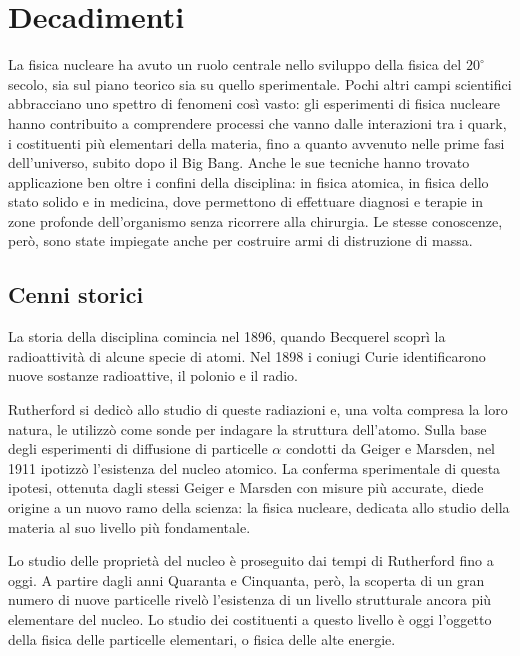 \restoregeometry


\chapter{Decadimenti}

La fisica nucleare ha avuto un ruolo centrale nello sviluppo della fisica del $20^\circ$ secolo, sia sul piano teorico sia su quello sperimentale. 
Pochi altri campi scientifici abbracciano uno spettro di fenomeni così vasto: gli esperimenti di fisica nucleare hanno contribuito a comprendere processi che vanno dalle interazioni tra i quark, i costituenti più elementari della materia, fino a quanto avvenuto nelle prime fasi dell'universo, subito dopo il Big Bang. 
Anche le sue tecniche hanno trovato applicazione ben oltre i confini della disciplina: in fisica atomica, in fisica dello stato solido e in medicina, dove permettono di effettuare diagnosi e terapie in zone profonde dell'organismo senza ricorrere alla chirurgia. Le stesse conoscenze, però, sono state impiegate anche per costruire armi di distruzione di massa.\\

\section*{Cenni storici}

La storia della disciplina comincia nel 1896, quando Becquerel scoprì la radioattività di alcune specie di atomi. Nel 1898 i coniugi Curie identificarono nuove sostanze radioattive, il polonio e il radio. 

Rutherford si dedicò allo studio di queste radiazioni e, una volta compresa la loro natura, le utilizzò come sonde per indagare la struttura dell'atomo. Sulla base degli esperimenti di diffusione di particelle $\alpha$ condotti da Geiger e Marsden, nel 1911 ipotizzò l'esistenza del nucleo atomico. La conferma sperimentale di questa ipotesi, ottenuta dagli stessi Geiger e Marsden con misure più accurate, diede origine a un nuovo ramo della scienza: la fisica nucleare, dedicata allo studio della materia al suo livello più fondamentale. 

Lo studio delle proprietà del nucleo è proseguito dai tempi di Rutherford fino a oggi. A partire dagli anni Quaranta e Cinquanta, però, la scoperta di un gran numero di nuove particelle rivelò l'esistenza di un livello strutturale ancora più elementare del nucleo. Lo studio dei costituenti a questo livello è oggi l'oggetto della fisica delle particelle elementari, o fisica delle alte energie.\\

